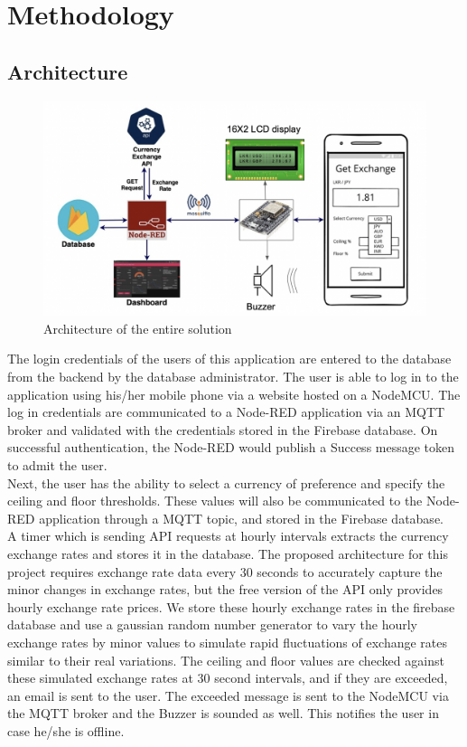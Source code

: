 \section{Methodology}

\subsection{Architecture}

\begin{figure}[h]
    \centering
      \includegraphics[width=1\textwidth]{images/arch.png}
    \caption{Architecture of the entire solution}
    \label{fig:arch}
\end{figure}

The login credentials of the users of this application are entered to the database from the backend by the database administrator. The user is able to log  in to the application using his/her mobile phone via a website hosted on a NodeMCU. The log in credentials are communicated to a Node-RED application via an MQTT broker and validated with the credentials stored in the Firebase database. On successful authentication, the Node-RED would publish a Success message token to admit the user.\\

Next, the user has the ability to select a currency of preference and specify the ceiling and floor thresholds. These values will also be communicated to the Node-RED application through a MQTT topic, and stored in the Firebase database.\\

A timer which is sending API requests at hourly intervals extracts the currency exchange rates and stores it in the database. The proposed architecture for this project requires exchange rate data every 30 seconds to accurately capture the minor changes in exchange rates, but the free version of the API only provides hourly exchange rate prices. We store these hourly exchange rates in the firebase database and use a gaussian random number generator to vary the hourly exchange rates by minor values to simulate rapid fluctuations of exchange rates similar to their real variations. The ceiling and floor values are checked against these simulated exchange rates at 30 second intervals, and if they are exceeded, an email is sent to the user. The exceeded message is sent to the NodeMCU via the MQTT broker and the Buzzer is sounded as well. This notifies the user in case he/she is offline.\\

